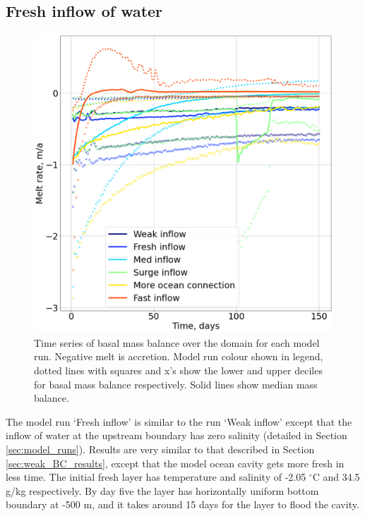 \subsection{Fresh inflow of water} \label{sec:fresh_inflow}
\begin{figure}[!ht]
\centering
\includegraphics[width=1\textwidth]{chapters/4/compare_melt_sum.png}
\caption[Melt sum comparison]{Time series of basal mass balance over the domain for each model run. Negative melt is accretion. Model run colour shown in legend, dotted lines with squares and x's show the lower and upper deciles for basal mass balance respectively. Solid lines show median mass balance.}
\label{fig:compare_melt_sum}
\end{figure}


The model run `Fresh inflow' is similar to the run `Weak inflow' except that the inflow of water at the upstream boundary has zero salinity (detailed in Section \ref{sec:model_runs}). Results are very similar to that described in Section \ref{sec:weak_BC_results}, except that the model ocean cavity gets more fresh in less time.
The initial fresh layer has temperature and salinity of -2.05 $^{\circ}$C and 34.5  g/kg respectively.  By day five the layer has horizontally uniform bottom boundary at -500 m, and it takes around 15 days for the layer to flood the cavity.


